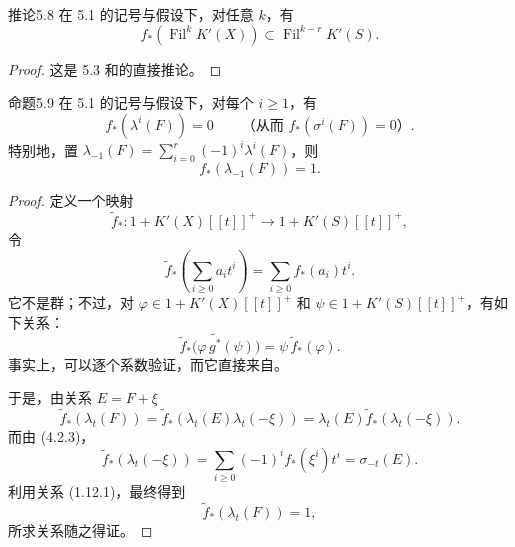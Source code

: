 \begin{SGAresult}{推论}{5.8}
在 5.1 的记号与假设下，对任意 $k$，有
\[
f_*(\operatorname{Fil}^kK'(X))\subset\operatorname{Fil}^{k-r}K'(S).
\]
\end{SGAresult}
\begin{proof}
这是 5.3 和的直接推论。
\end{proof}

\begin{SGAresult}{命题}{5.9}
在 5.1 的记号与假设下，对每个 $i\geq1$，有
\[
f_*(\lambda^i(F))=0\qquad\text{（从而 }f_*(\sigma^i(F))=0\text{）}.
\]
特别地，置 $\lambda_{-1}(F)=\sum_{i=0}^r(-1)^i\lambda^i(F)$，则
\[
f_*(\lambda_{-1}(F))=1.
\]
\end{SGAresult}
\begin{proof}
定义一个映射
\[
\widetilde f_*\colon1+K'(X)[[t]]^+\longrightarrow1+K'(S)[[t]]^+,
\]
令
\[
\widetilde f_*\left(\sum_{i\geq0}a_it^i\right)=\sum_{i\geq0}f_*(a_i)t^i.
\]
它不是群；不过，对 $\varphi\in1+K'(X)[[t]]^+$ 和 $\psi\in1+K'(S)[[t]]^+$，有如下关系：
\[
\widetilde f_*\bigl(\varphi\,\widetilde{g^*}(\psi)\bigr)=\psi\,\widetilde f_*(\varphi).
\]
事实上，可以逐个系数验证，而它直接来自。

于是，由关系 $E=F+\xi$ 
\[
\widetilde f_*(\lambda_t(F))
=\widetilde f_*(\lambda_t(E)\lambda_t(-\xi))
=\lambda_t(E)\widetilde f_*(\lambda_t(-\xi)).
\]
而由 (4.2.3)，
\[
\widetilde f_*(\lambda_t(-\xi))=\sum_{i\geq0}(-1)^if_*(\xi^i)t^i=\sigma_{-t}(E).
\]
利用关系 (1.12.1)，最终得到
\[
\widetilde f_*(\lambda_t(F))=1,
\]
所求关系随之得证。
\end{proof}


